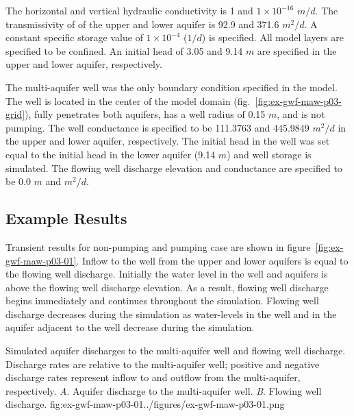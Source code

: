

The horizontal and vertical hydraulic conductivity is 1 and $1 \times 10^{-16}$ $m/d$. The transmissivity of of the upper and lower aquifer is 92.9 and 371.6 $m^2/d$. A constant specific storage value of $1 \times 10^{-4}$ ($1/d$) is specified. All model layers are specified to be confined. An initial head of 3.05 and 9.14 $m$ are specified in the upper and lower aquifer, respectively. 

The multi-aquifer well was the only boundary condition specified in the model. The well is located in the center of the model domain (fig.~\ref{fig:ex-gwf-maw-p03-grid}), fully penetrates both aquifers, has a well radius of 0.15 $m$, and is not pumping. The well conductance is specified to be 111.3763 and 445.9849 $m^{2}/d$ in the upper and lower aquifer, respectively. The initial head in the well was set equal to the initial head in the lower aquifer (9.14 $m$) and well storage is simulated. The flowing well discharge elevation and conductance are specified to be 0.0 $m$ and $m^{2}/d$.

\subsection{Example Results}

Transient results for non-pumping and pumping case are shown in figure~\ref{fig:ex-gwf-maw-p03-01}. Inflow to the well from the upper and lower aquifers is equal to the flowing well discharge. Initially the water level in the well and aquifers is above the flowing well discharge elevation. As a result, flowing well discharge begins immediately and continues throughout the simulation. Flowing well discharge decreases during the simulation as water-levels in the well and in the aquifer adjacent to the well decrease during the simulation.


\begin{StandardFigure}{
                                     Simulated aquifer discharges to the multi-aquifer well and flowing well discharge. 
                                     Discharge rates are relative to the multi-aquifer well; positive and negative discharge rates 
                                     represent inflow to and outflow from the multi-aquifer, respectively.
                                     \textit{A}. Aquifer discharge to the multi-aquifer well.
                                     \textit{B}. Flowing well discharge. 
                                     }{fig:ex-gwf-maw-p03-01}{../figures/ex-gwf-maw-p03-01.png}
\end{StandardFigure}                                 

